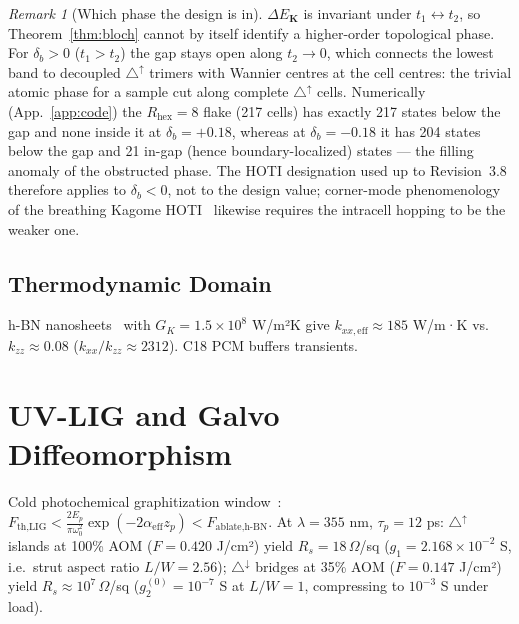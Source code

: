 \documentclass[11pt,a4paper]{article}
\theoremstyle{definition}
\theoremstyle{remark}
\newtheorem{remark}[theorem]{Remark}
\begin{document}
\begin{remark}[Which phase the design is in]\label{rem:phase}
$\Delta E_{\mathbf{K}}$ is invariant under $t_1\leftrightarrow t_2$, so Theorem~\ref{thm:bloch} cannot by itself identify a higher-order topological phase. For $\delta_b>0$ ($t_1>t_2$) the gap stays open along $t_2\to 0$, which connects the lowest band to decoupled $\triangle^{\uparrow}$ trimers with Wannier centres at the cell centres: the trivial atomic phase for a sample cut along complete $\triangle^{\uparrow}$ cells. Numerically (App.~\ref{app:code}) the $R_{\text{hex}}=8$ flake (217 cells) has exactly 217 states below the gap and none inside it at $\delta_b=+0.18$, whereas at $\delta_b=-0.18$ it has 204 states below the gap and 21 in-gap (hence boundary-localized) states --- the filling anomaly of the obstructed phase. The HOTI designation used up to Revision~3.8 therefore applies to $\delta_b<0$, not to the design value; corner-mode phenomenology of the breathing Kagome HOTI~\cite{ezawa2018} likewise requires the intracell hopping to be the weaker one.
\end{remark}

\subsection{Thermodynamic Domain}
h-BN nanosheets~\cite{zeng2015} with $G_K = 1.5\times 10^8$ W/m²K give $k_{xx,\text{eff}} \approx 185$ W/m·K vs.\ $k_{zz} \approx 0.08$ ($k_{xx}/k_{zz}\approx 2312$). C18 PCM buffers transients.

\section{UV-LIG and Galvo Diffeomorphism}

Cold photochemical graphitization window~\cite{lin2014}: $F_{\text{th,LIG}} < \frac{2E_p}{\pi\omega_0^2}\exp(-2\alpha_{\text{eff}}z_p) < F_{\text{ablate,h-BN}}$. At $\lambda = 355$ nm, $\tau_p = 12$ ps: $\triangle^{\uparrow}$ islands at 100\% AOM ($F = 0.420$ J/cm²) yield $R_s = 18\,\Omega$/sq ($g_1 = 2.168\times 10^{-2}$ S, i.e.\ strut aspect ratio $L/W = 2.56$); $\triangle^{\downarrow}$ bridges at 35\% AOM ($F = 0.147$ J/cm²) yield $R_s \approx 10^7\,\Omega$/sq ($g_2^{(0)} = 10^{-7}$ S at $L/W=1$, compressing to $10^{-3}$ S under load).
\end{document}
